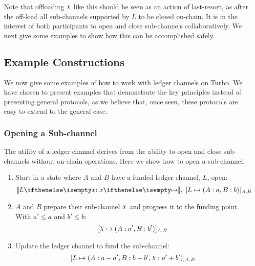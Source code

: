 Note that offloading $\rchi$ like this should be seen as an action of last-resort, as after the off-load all sub-channels supported by $L$ to be closed on-chain.
It is in the interest of both participants to open and close sub-channels collaboratively.
We next give some examples to show how this can be accomplished safely.

\subsection{Example Constructions}

We now give some examples of how to work with ledger channels on Turbo.
We have chosen to present examples that demonstrate the key principles instead of presenting general protocols, as we believe that, once seen, these protocols are easy to extend to the general case.

\subsubsection{Opening a Sub-channel}

\begin{figure}[h]\centering
  \makebox[\textwidth][c]{}
  \caption{
  }\label{fig:opening-sub-channel}
\end{figure}

The utility of a ledger channel derives from the ability to open and close sub-channels without on-chain operations.
Here we show how to open a sub-channel.
\begin{enumerate}
  \item Start in a state where $A$ and $B$ have a funded ledger channel, $L$, open:
  \begin{align}
    \adj{\holds{L}{x}{}}, \; \finalizable{L}{\alloc{A: a, B: b}}{A, B}
  \end{align}
  \item $A$ and $B$ prepare their sub-channel $\rchi$ and progress it to the funding point. With $a' \leq a$ and $b' \leq b$:
  \begin{align}
    \finalizable{\rchi}{\alloc{A:a', B:b'}}{A,B}
  \end{align}
  \item Update the ledger channel to fund the sub-channel:
  \begin{align}
    \finalizable{L}{\alloc{A:a-a', B: b - b', \rchi: a' + b'}}{A,B}
  \end{align}
\end{enumerate}

